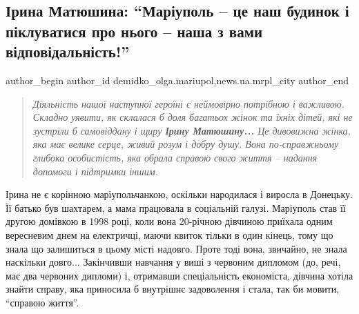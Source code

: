  
 
 
 
 
 
\subsection{Ірина Матюшина: \enquote{Маріуполь – це наш будинок і піклуватися про нього – наша з вами відповідальність!}}
\label{sec:23_12_2019.stz.news.ua.mrpl_city.1.iryna_matjushyna_mrpl_nash_budynok}
 
\ifcmt
 author_begin
   author_id demidko_olga.mariupol,news.ua.mrpl_city
 author_end
\fi

\begin{quote}
\em Діяльність нашої наступної героїні є неймовірно потрібною і важливою.
Складно уявити, як склалася б доля багатьох жінок та їхніх дітей, які не
зустріли б самовіддану і щиру \textbf{Ірину Матюшину...} Це дивовижна жінка, яка має
велике серце, живий розум і добру душу. Вона по-справжньому глибока
особистість, яка обрала справою свого життя – надання допомоги і підтримки
іншим.
\end{quote}


Ірина не є корінною маріупольчанкою, оскільки народилася і виросла в Донецьку.
Її батько був шахтарем, а мама працювала в соціальній галузі. Маріуполь став її
другою домівкою в 1998 році, коли вона 20-річною дівчиною приїхала одним
вересневим днем на електричці, маючи квиток тільки в один кінець, тому що знала
що залишиться в цьому місті надовго. Проте тоді вона, звичайно, не знала
наскільки довго... Закінчивши навчання у виші з червоним дипломом (до, речі,
має два червоних дипломи) і, отримавши спеціальність економіста, дівчина хотіла
знайти справу, яка приносила б внутрішнє задоволення і стала, так би мовити,
\enquote{справою життя}.

